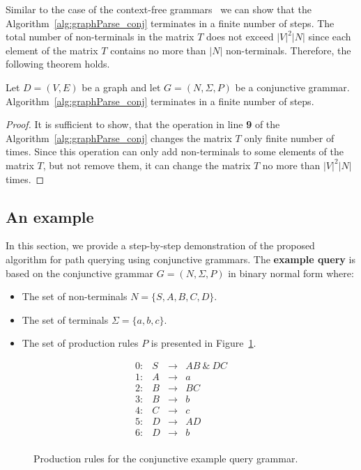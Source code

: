 Similar to the case of the context-free grammars~\cite{azimov2018context} we can show that the Algorithm~\ref{alg:graphParse_conj} terminates in a finite number of steps. The total number of non-terminals in the matrix $T$ does not exceed $|V|^2|N|$ since each element of the matrix $T$ contains no more than $|N|$ non-terminals. Therefore, the following theorem holds.

\begin{mytheorem}\label{thm:finite_conj}
	Let $D = (V,E)$ be a graph and let $G =(N,\Sigma,P)$ be a conjunctive grammar. Algorithm~\ref{alg:graphParse_conj} terminates in a finite number of steps. 
\end{mytheorem}
\begin{proof}
	It is sufficient to show, that the operation in line \textbf{9} of the Algorithm~\ref{alg:graphParse_conj} changes the matrix $T$ only finite number of times. Since this operation can only add non-terminals to some elements of the matrix $T$, but not remove them, it can change the matrix $T$ no more than $|V|^2|N|$ times.
\end{proof}

\subsection{An example}
In this section, we provide a step-by-step demonstration of the proposed algorithm for path querying using conjunctive grammars. The \textbf{example query} is based on the conjunctive grammar $G = (N, \Sigma, P)$ in binary normal form where:
\begin{itemize}
	\item The set of non-terminals $N = \{S, A, B, C, D\}$.
	\item The set of terminals $\Sigma = \{a, b, c\}.$
	\item The set of production rules $P$ is presented in Figure~\ref{ProductionRulesExampleQueryConj}.
\end{itemize}

\begin{figure}[h]
	\[
	\begin{array}{rccl}
	0: & S & \rightarrow & AB \ \& \ DC \\ 
	1: & A & \rightarrow & a \\ 
	2: & B & \rightarrow & BC \\ 
	3: & B & \rightarrow & b \\
	4: & C & \rightarrow & c \\ 
	5: & D & \rightarrow & AD \\ 
	6: & D & \rightarrow & b \\ 
	\end{array}
	\]
	\caption{Production rules for the conjunctive example query grammar.}
	\label{ProductionRulesExampleQueryConj}
\end{figure}

